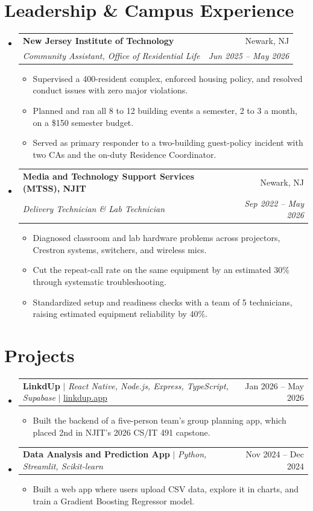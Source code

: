 \documentclass[letterpaper,11pt]{article}
\makeatletter
\newcommand{\resumeItem}[1]{\item\small{#1}}
\newcommand{\resumeSubheading}[4]{
  \vspace{-2pt}\item
    \begin{tabular*}{0.97\textwidth}[t]{l@{\extracolsep{\fill}}r}
      \textbf{#1} & #2 \\
      \textit{\small#3} & \textit{\small #4} \\
    \end{tabular*}\vspace{-7pt}
}
\newcommand{\resumeProjectHeading}[2]{
    \item
    \begin{tabular*}{0.97\textwidth}{l@{\extracolsep{\fill}}r}
      \small#1 & #2 \\
    \end{tabular*}\vspace{-7pt}
}
\newcommand{\resumeSubHeadingListStart}{\begin{itemize}[leftmargin=0.15in, label={}, itemsep=1pt, parsep=0pt, topsep=2pt]}
\newcommand{\resumeSubHeadingListEnd}{\end{itemize}}
\newcommand{\resumeItemListStart}{\begin{itemize}[topsep=6pt,itemsep=0pt,parsep=0pt,partopsep=0pt]}
\newcommand{\resumeItemListEnd}{\end{itemize}\vspace{-5pt}}
\makeatother
\begin{document}
\section{Leadership \& Campus Experience}
  \resumeSubHeadingListStart
    \resumeSubheading
      {New Jersey Institute of Technology}{Newark, NJ}
      {Community Assistant, Office of Residential Life}{Jun 2025 -- May 2026}
      \resumeItemListStart
        \resumeItem{Supervised a 400-resident complex, enforced housing policy, and resolved conduct issues with zero major violations.}
        \resumeItem{Planned and ran all 8 to 12 building events a semester, 2 to 3 a month, on a \$150 semester budget.}
        \resumeItem{Served as primary responder to a two-building guest-policy incident with two CAs and the on-duty Residence Coordinator.}
      \resumeItemListEnd
    \resumeSubheading
      {Media and Technology Support Services (MTSS), NJIT}{Newark, NJ}
      {Delivery Technician \& Lab Technician}{Sep 2022 -- May 2026}
      \resumeItemListStart
        \resumeItem{Diagnosed classroom and lab hardware problems across projectors, Crestron systems, switchers, and wireless mics.}
        \resumeItem{Cut the repeat-call rate on the same equipment by an estimated 30\% through systematic troubleshooting.}
        \resumeItem{Standardized setup and readiness checks with a team of 5 technicians, raising estimated equipment reliability by 40\%.}
      \resumeItemListEnd
  \resumeSubHeadingListEnd

\section{Projects}
    \resumeSubHeadingListStart
      \resumeProjectHeading
          {\textbf{LinkdUp} $|$ \emph{React Native, Node.js, Express, TypeScript, Supabase} $|$ \href{https://linkdup.app}{\underline{linkdup.app}}}{Jan 2026 -- May 2026}
          \resumeItemListStart
            \resumeItem{Built the backend of a five-person team's group planning app, which placed 2nd in NJIT's 2026 CS/IT 491 capstone.}
          \resumeItemListEnd
      \resumeProjectHeading
          {\textbf{Data Analysis and Prediction App} $|$ \emph{Python, Streamlit, Scikit-learn}}{Nov 2024 -- Dec 2024}
          \resumeItemListStart
            \resumeItem{Built a web app where users upload CSV data, explore it in charts, and train a Gradient Boosting Regressor model.}
          \resumeItemListEnd
    \resumeSubHeadingListEnd
\end{document}

